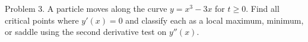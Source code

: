 \documentclass[11pt]{article}
\begin{document}
Problem 3. A particle moves along the curve $y = x^3 - 3x$ for $t \geq 0$.
Find all critical points where $y'(x) = 0$ and classify each as a local
maximum, minimum, or saddle using the second derivative test on $y''(x)$.
\end{document}
